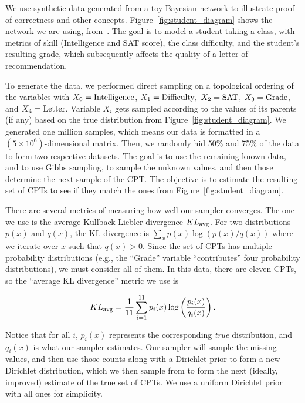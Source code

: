\documentclass{article} %
\begin{document}
We use synthetic data generated from a toy Bayesian network to illustrate proof of correctness and
other concepts. Figure~\ref{fig:student_diagram} shows the network we are using,
from~\citet{koller2009}. The goal is to model a student taking a class, with metrics of skill
(Intelligence and SAT score), the class difficulty, and the student's resulting grade, which
subsequently affects the quality of a letter of recommendation.

To generate the data, we performed direct sampling on a topological ordering of the variables with
$X_0 = {\rm Intelligence}$, $X_1 = {\rm Difficulty},$ $X_2 = {\rm SAT}$, $X_3 = {\rm Grade}$, and
$X_4 = {\rm Letter}$. Variable $X_i$ gets sampled according to the values of its parents (if any)
based on the true distribution from Figure~\ref{fig:student_diagram}. We generated one million
samples, which means our data is formatted in a $(5\times 10^6)$-dimensional matrix. Then, we
randomly hid 50\% and 75\% of the data to form two respective datasets. The goal is to use the
remaining known data, and to use Gibbs sampling, to sample the unknown values, and then those
determine the next sample of the CPT. The objective is to estimate the resulting set of CPTs to see
if they match the ones from Figure~\ref{fig:student_diagram}.

There are several metrics of measuring how well our sampler converges. The one we use is the average
Kullback-Liebler divergence $KL_{\rm avg}$. For two distributions $p(x)$ and $q(x)$, the
KL-divergence is $\sum_x p(x) \log(p(x)/q(x))$ where we iterate over $x$ such that $q(x) > 0$. Since
the set of CPTs has multiple probability distributions (e.g., the ``Grade'' variable ``contributes''
four probability distributions), we must consider all of them. In this data, there are eleven CPTs,
so the ``average KL divergence'' metric we use is

\begin{equation}\label{eq:avg_kl}
KL_{\rm avg} = \frac{1}{11}\sum_{i=1}^{11} p_i(x) \log\left(\frac{p_i(x)}{q_i(x)}\right).
\end{equation}

Notice that for all $i$, $p_i(x)$ represents the corresponding \emph{true} distribution, and
$q_i(x)$ is what our sampler estimates. Our sampler will sample the missing values, and then use
those counts along with a Dirichlet prior to form a new Dirichlet distribution, which we then sample
from to form the next (ideally, improved) estimate of the true set of CPTs. We use a uniform
Dirichlet prior with all ones for simplicity.
\end{document}
